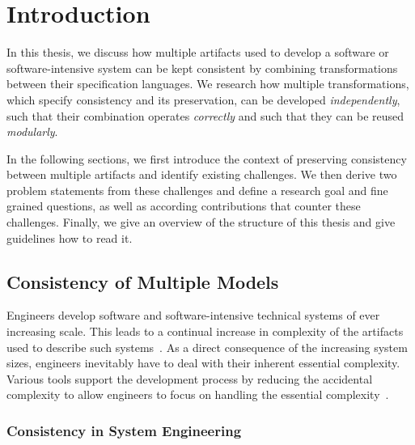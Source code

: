 \chapter{Introduction
}
\label{chap:introduction}

In this thesis, we discuss how multiple artifacts used to develop a software or software-intensive system can be kept consistent by combining transformations between their specification languages.
We research how multiple transformations, which specify consistency and its preservation, can be developed \emph{independently}, such that their combination operates \emph{correctly} and such that they can be reused \emph{modularly}.

In the following sections, we first introduce the context of preserving consistency between multiple artifacts and identify existing challenges. We then derive two problem statements from these challenges and define a research goal and fine grained questions, as well as according contributions that counter these challenges.
Finally, we give an overview of the structure of this thesis and give guidelines how to read it.


\section{Consistency of Multiple Models}

Engineers develop software and software-intensive technical systems of ever increasing scale.
This leads to a continual increase in complexity of the artifacts used to describe such systems~\cite{murer2011evolution}.
As a direct consequence of the increasing system sizes, engineers inevitably have to deal with their inherent essential complexity.
Various tools support the development process by reducing the accidental complexity to allow engineers to focus on handling the essential complexity~\cite{brooks1987NoSilverBullet-Computer, fraser2008NoSilverBulletReloaded-Software}.

\subsection{Consistency in System Engineering}

